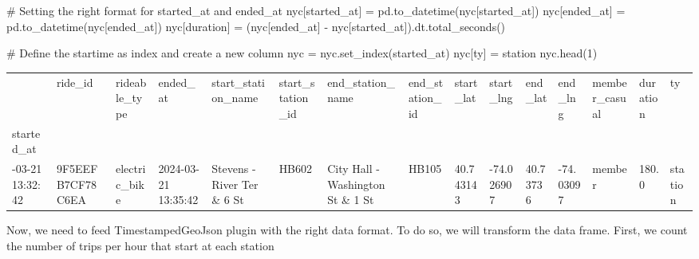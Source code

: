 \documentclass[
  letterpaper,
  DIV=11,
  numbers=noendperiod]{scrreprt}
\newenvironment{Shaded}{\begin{snugshade}}{\end{snugshade}}
\newcommand{\CommentTok}[1]{\textcolor[rgb]{0.37,0.37,0.37}{#1}}
\newcommand{\DecValTok}[1]{\textcolor[rgb]{0.68,0.00,0.00}{#1}}
\newcommand{\NormalTok}[1]{\textcolor[rgb]{0.00,0.23,0.31}{#1}}
\newcommand{\OperatorTok}[1]{\textcolor[rgb]{0.37,0.37,0.37}{#1}}
\newcommand{\StringTok}[1]{\textcolor[rgb]{0.13,0.47,0.30}{#1}}
\begin{document}
\begin{Shaded}
\begin{Highlighting}[]
\CommentTok{\# Setting the right format for started\_at and ended\_at}
\NormalTok{nyc[}\StringTok{\textquotesingle{}started\_at\textquotesingle{}}\NormalTok{] }\OperatorTok{=}\NormalTok{ pd.to\_datetime(nyc[}\StringTok{\textquotesingle{}started\_at\textquotesingle{}}\NormalTok{])}
\NormalTok{nyc[}\StringTok{\textquotesingle{}ended\_at\textquotesingle{}}\NormalTok{] }\OperatorTok{=}\NormalTok{ pd.to\_datetime(nyc[}\StringTok{\textquotesingle{}ended\_at\textquotesingle{}}\NormalTok{])}
\NormalTok{nyc[}\StringTok{\textquotesingle{}duration\textquotesingle{}}\NormalTok{] }\OperatorTok{=}\NormalTok{ (nyc[}\StringTok{\textquotesingle{}ended\_at\textquotesingle{}}\NormalTok{] }\OperatorTok{{-}}\NormalTok{ nyc[}\StringTok{\textquotesingle{}started\_at\textquotesingle{}}\NormalTok{]).dt.total\_seconds()}

\CommentTok{\# Define the startime as index and create a new column}
\NormalTok{nyc }\OperatorTok{=}\NormalTok{ nyc.set\_index(}\StringTok{\textquotesingle{}started\_at\textquotesingle{}}\NormalTok{)}
\NormalTok{nyc[}\StringTok{\textquotesingle{}ty\textquotesingle{}}\NormalTok{] }\OperatorTok{=} \StringTok{\textquotesingle{}station\textquotesingle{}}
\NormalTok{nyc.head(}\DecValTok{1}\NormalTok{)}
\end{Highlighting}
\end{Shaded}

\begin{longtable}[]{@{}lllllllllllllll@{}}
\toprule\noalign{}
& ride\_id & rideable\_type & ended\_at & start\_station\_name &
start\_station\_id & end\_station\_name & end\_station\_id & start\_lat
& start\_lng & end\_lat & end\_lng & member\_casual & duration & ty \\
started\_at & & & & & & & & & & & & & & \\
\midrule\noalign{}
\endhead
\bottomrule\noalign{}
\endlastfoot
2024-03-21 13:32:42 & 9F5EEFB7CF78C6EA & electric\_bike & 2024-03-21
13:35:42 & Stevens - River Ter \& 6 St & HB602 & City Hall - Washington
St \& 1 St & HB105 & 40.743143 & -74.026907 & 40.73736 & -74.03097 &
member & 180.0 & station \\
\end{longtable}

Now, we need to feed TimestampedGeoJson plugin with the right data
format. To do so, we will transform the data frame. First, we count the
number of trips per hour that start at each station
\end{document}
